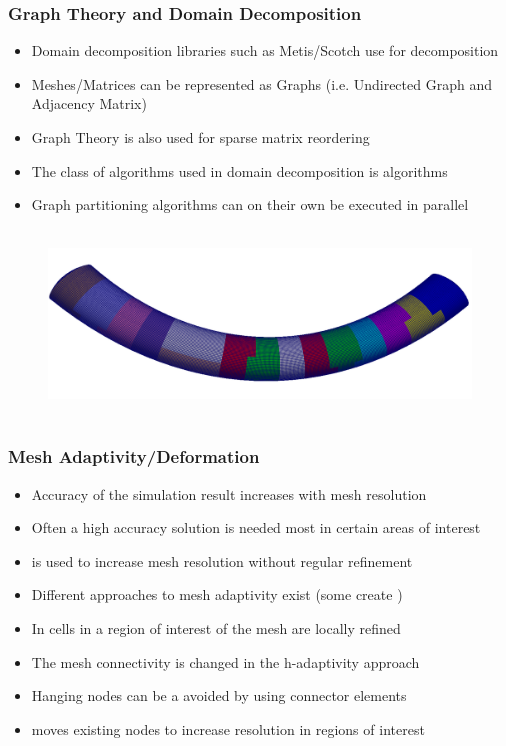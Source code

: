 \begin{frame}
\frametitle{Graph Theory and Domain Decomposition}
\begin{itemize}
\item Domain decomposition libraries such as Metis/Scotch use  for decomposition
\item Meshes/Matrices can be represented as Graphs (i.e. Undirected Graph and Adjacency Matrix)
\item Graph Theory is also used for sparse matrix reordering 
\item The class of algorithms used in domain decomposition is  algorithms
\item Graph partitioning algorithms can on their own be executed in parallel
\end{itemize}
\begin{figure}[h!]
\centering
\includegraphics[height=5cm]{screenshots/domain-decomposition.png}
\label{fig:domains}
\end{figure}
\end{frame}

\begin{frame}
\frametitle{Mesh Adaptivity/Deformation}
\begin{itemize}
\item Accuracy of the simulation result increases with mesh resolution
\item Often a high accuracy solution is needed most in certain areas of interest
\item {} is used to increase mesh resolution without regular refinement
\item Different approaches to mesh adaptivity exist (some create )
\item In  cells in a region of interest of the mesh are locally refined
\item The mesh connectivity is changed in the h-adaptivity approach
\item Hanging nodes can be a avoided by using connector elements
\item {} moves existing nodes to increase resolution in regions of interest
\end{itemize}
\end{frame}

